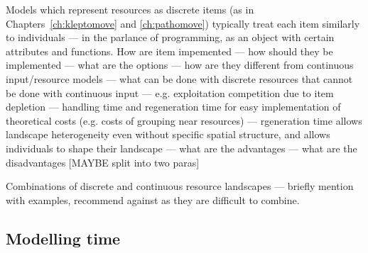 Models which represent resources as discrete items (as in Chapters~\ref{ch:kleptomove} and \ref{ch:pathomove}) typically treat each item similarly to individuals --- in the parlance of programming, as an object with certain attributes and functions.
How are item impemented --- how should they be implemented --- what are the options --- how are they different from continuous input/resource models --- what can be done with discrete resources that cannot be done with continuous input --- e.g. exploitation competition due to item depletion --- handling time and regeneration time for easy implementation of theoretical costs (e.g. costs of grouping near resources) --- rgeneration time allows landscape heterogeneity even without specific spatial structure, and allows individuals to shape their landscape --- what are the advantages --- what are the disadvantages [MAYBE split into two paras]

Combinations of discrete and continuous resource landscapes --- briefly mention with examples, recommend against as they are difficult to combine.

\subsection*{Modelling time}

